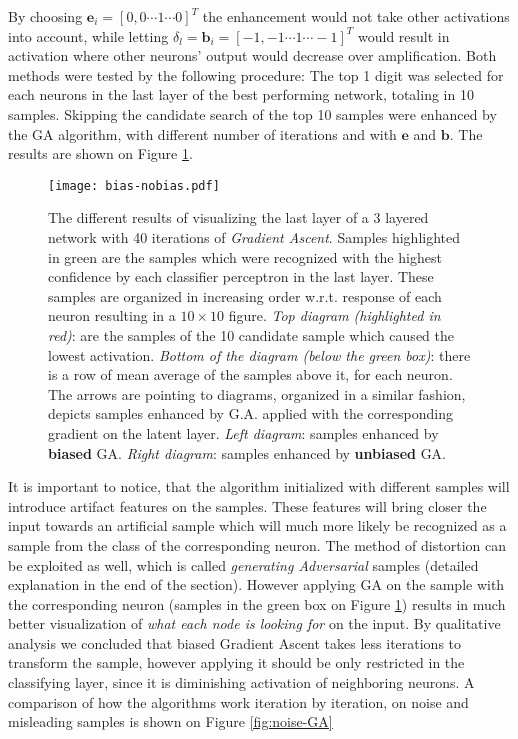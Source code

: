By choosing $\mathbf{e}_{i} = [0, 0 \cdots 1 \cdots 0]^T$ the enhancement would not take other activations into account, while letting $\delta_l = \mathbf{b}_i = [-1, -1 \cdots 1 \cdots -1]^T$ would result in activation where other neurons' output would decrease over amplification. 
Both methods were tested by the following procedure: The top 1 digit was selected for each neurons in the last layer of the best performing network, totaling in 10 samples. Skipping the candidate search of the top 10 samples were enhanced by the GA algorithm, with different number of iterations and with $\mathbf{e}$ and $ \mathbf{b}$. The results are shown on Figure \ref{fig:bias-nobias}. 

\begin{figure}
    \centering
    \texttt{[image: bias-nobias.pdf]}
    \caption{
        The different results of visualizing the last layer of a 3 layered network with 40 iterations of \emph{Gradient Ascent}. 
        Samples highlighted in green are the samples which were recognized with the highest confidence by each classifier perceptron in the last layer.
        These samples are organized in increasing order w.r.t. response of each neuron resulting in a $10 \times 10$ figure.
        \emph{Top diagram (highlighted in red)}: are the samples of the 10 candidate sample which caused the lowest activation.
        \emph{Bottom of the diagram (below the green box)}: there is a row of mean average of the samples above it, for each neuron.
        The arrows are pointing to diagrams, organized in a similar fashion, depicts samples enhanced by 
            G.A. applied with the corresponding gradient on the latent layer. 
        \emph{Left diagram}: samples enhanced by \textbf{biased} GA.
        \emph{Right diagram}: samples enhanced by \textbf{unbiased} GA.
    }
    \label{fig:bias-nobias}
\end{figure}
It is important to notice, that the algorithm initialized with different samples will introduce artifact features on the samples. 
These features will bring closer the input towards an artificial sample which will much more likely be recognized as a sample from the class of the corresponding neuron. 
The method of distortion can be exploited as well, which is called \emph{generating Adversarial} samples (detailed explanation in the end of the section).
However applying GA on the sample with the corresponding neuron (samples in the green box on Figure \ref{fig:bias-nobias}) results in much better visualization of \emph{what each node is looking for} on the input.
By qualitative analysis we concluded that biased Gradient Ascent takes less iterations to transform the sample, however applying it should be  only restricted in the classifying layer, since it is diminishing activation of neighboring neurons. 
A comparison of how the algorithms work iteration by iteration, on noise and misleading samples is shown on Figure \ref{fig:noise-GA}
    

